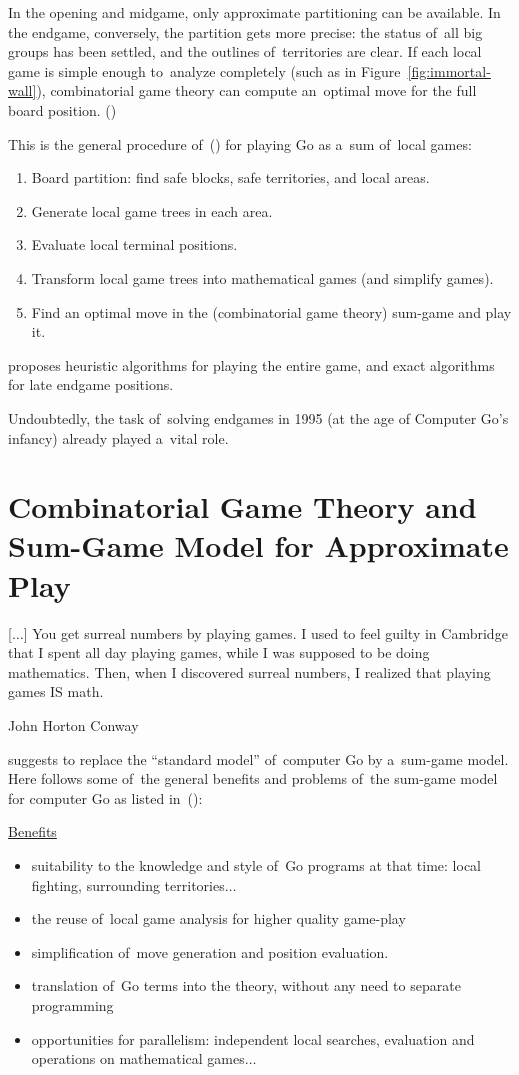 In the opening and midgame, only approximate partitioning can be available.
In the endgame, conversely, the partition gets more precise:
the status of~all big groups has been settled, and the outlines of~territories are clear.
If each local game is simple enough to~analyze completely (such as in Figure~\ref{fig:immortal-wall}), combinatorial game theory can compute an~optimal move for the full board position.
(\cite{Muller1995computer})

This is the general procedure of~(\cite{Muller1995computer}) for playing Go as a~sum of~local games:
\begin{enumerate}
  \item Board partition: find safe blocks, safe territories, and local areas.
  \item Generate local game trees in each area.
  \item Evaluate local terminal positions.
  \item Transform local game trees into mathematical games (and simplify games).
  \item Find an optimal move in the (combinatorial game theory) sum-game and play it.
\end{enumerate}
\Mueller{} proposes heuristic algorithms for playing the entire game, and exact algorithms for late endgame positions.

Undoubtedly, the task of~solving endgames in 1995 (at the age of Computer Go's infancy) already played a~vital role.

\section{Combinatorial Game Theory and Sum-Game Model for Approximate Play}

\epigraph{
  [$\dots$]
  You get surreal numbers by playing games.
  I used to feel guilty in Cambridge that I spent all day playing games, while I was supposed to be doing mathematics.
  Then, when I discovered surreal numbers, I realized that playing games IS math.
}{John Horton Conway}

\Mueller{} suggests to replace the ``standard model'' of~computer Go by a~sum-game model.
Here follows some of~the general benefits and problems of~the sum-game model for computer Go as listed in~(\cite{Muller1995computer}):

\medskip

\underline{Benefits}
\begin{itemize}[+]
  \item suitability to the knowledge and style of~Go programs at that time:
    local fighting, surrounding territories$\dots$
  \item the reuse of~local game analysis for higher quality game-play
  \item simplification of~move generation and position evaluation.
  \item translation of~Go terms into the theory, without any need to separate programming
  \item opportunities for parallelism:
    independent local searches, evaluation and operations on mathematical games$\dots$
\end{itemize}

